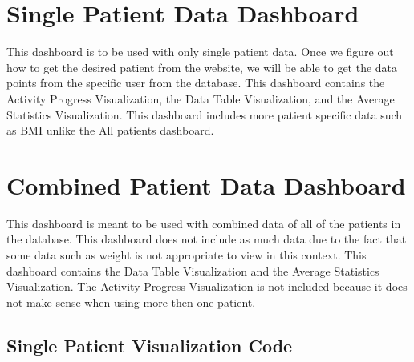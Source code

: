 \documentclass[]{book}
\begin{document}
\hypertarget{single-patient-data-dashboard}{%
\section{Single Patient Data Dashboard}\label{single-patient-data-dashboard}}

This dashboard is to be used with only single patient data. Once we figure out how to get the desired patient from the website, we will be able to get the data points from the specific user from the database. This dashboard contains the Activity Progress Visualization, the Data Table Visualization, and the Average Statistics Visualization. This dashboard includes more patient specific data such as BMI unlike the All patients dashboard.

\hypertarget{combined-patient-data-dashboard}{%
\section{Combined Patient Data Dashboard}\label{combined-patient-data-dashboard}}

This dashboard is meant to be used with combined data of all of the patients in the database. This dashboard does not include as much data due to the fact that some data such as weight is not appropriate to view in this context. This dashboard contains the Data Table Visualization and the Average Statistics Visualization. The Activity Progress Visualization is not included because it does not make sense when using more then one patient.

\hypertarget{single-patient-visualization-code}{%
\subsection{Single Patient Visualization Code}\label{single-patient-visualization-code}}
\end{document}
